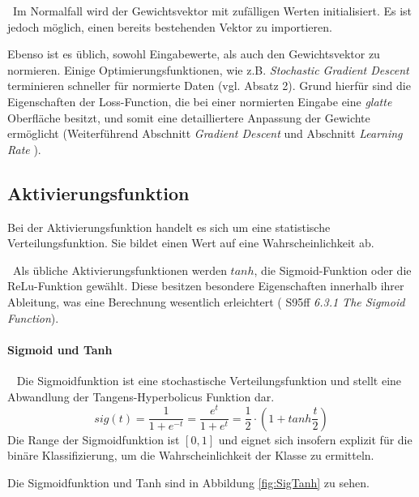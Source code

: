 ~\newline Im Normalfall wird der Gewichtsvektor mit zufälligen Werten initialisiert. Es ist jedoch möglich, einen bereits bestehenden Vektor zu importieren. 

Ebenso ist es üblich, sowohl Eingabewerte, als auch den Gewichtsvektor zu normieren. Einige Optimierungsfunktionen, wie z.B. \textit{Stochastic Gradient Descent} terminieren schneller für normierte Daten (vgl. \cite{GDQuora} Absatz 2). Grund hierfür sind die Eigenschaften der Loss-Function, die bei einer normierten Eingabe eine \textit{glatte} Oberfläche besitzt, und somit eine detailliertere Anpassung der Gewichte ermöglicht (Weiterführend \cite{GDBoost} Abschnitt \textit{Gradient Descent} und Abschnitt \textit{Learning Rate} ). 
\subsection{Aktivierungsfunktion}
\label{subsec:Aktivierungsfunktion} 
Bei der Aktivierungsfunktion handelt es sich um eine statistische Verteilungsfunktion. Sie bildet einen Wert auf eine Wahrscheinlichkeit ab. 

~\newline Als übliche Aktivierungsfunktionen werden $tanh$, die Sigmoid-Funktion oder die ReLu-Funktion gewählt. Diese besitzen besondere Eigenschaften innerhalb ihrer Ableitung, was eine Berechnung wesentlich erleichtert (\cite{stroetmann} S95ff \textit{6.3.1 The Sigmoid Function}).

\paragraph{Sigmoid und Tanh}~\newline
Die Sigmoidfunktion ist eine stochastische Verteilungsfunktion und stellt eine Abwandlung der Tangens-Hyperbolicus Funktion dar. 
\begin{equation}
\label{eq:sigmoid}
sig(t) = \dfrac{1}{1+e^{-t}}=\dfrac{e^t}{1+ e^t}= \frac{1}{2} \cdot ( 1 + tanh \frac{t}{2})
\end{equation}
Die Range der Sigmoidfunktion ist $[0,1]$ und eignet sich insofern explizit für die binäre Klassifizierung, um die Wahrscheinlichkeit der Klasse zu ermitteln. 

Die Sigmoidfunktion und Tanh sind in Abbildung \ref{fig:SigTanh} zu sehen. 

